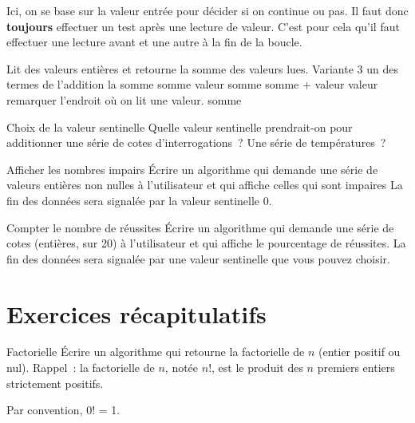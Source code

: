 		Ici, on se base sur la valeur entrée pour décider si on continue ou pas. 
		Il faut donc \textbf{toujours} effectuer un test
		après une lecture de valeur. C’est pour cela
		qu’il faut effectuer une lecture avant et une autre à
		la fin de la boucle.

		\begin{LDA}
		\LComment Lit des valeurs entières et retourne la somme des valeurs lues.
		 \RComment Variante 3
			 \RComment un des termes de l’addition
			 \RComment la somme
			\Let somme 
			\Read valeur
				\Let somme \Gets somme + valeur 
				\Read valeur \RComment remarquer l’endroit où on lit une valeur.
			\EndWhile
			\Return somme
		\EndAlgo
		\end{LDA}

		\begin{Exercice}{Choix de la valeur sentinelle}
			Quelle valeur sentinelle prendrait-on 
			pour additionner une série de cotes d’interrogations~? 
			Une série de températures~?
		\end{Exercice}

		\begin{Exercice}{Afficher les nombres impairs}
			Écrire un algorithme qui demande une série
			de valeurs entières non nulles à l'utilisateur
			et qui affiche celles qui sont impaires
			La fin des données sera signalée 
			par la valeur sentinelle 0.
		\end{Exercice}

		\begin{Exercice}{Compter le nombre de réussites}
			Écrire un algorithme qui demande une série
			de cotes (entières, sur 20) à l'utilisateur
			et qui affiche le pourcentage de réussites.
			La fin des données sera signalée 
			par une valeur sentinelle que vous pouvez choisir.
		\end{Exercice}
			
\section{Exercices récapitulatifs}

	\begin{Exercice}{Factorielle}
		Écrire un algorithme qui retourne la factorielle de $n$ (entier positif ou
		nul). Rappel~: la factorielle de $n$, notée $n$!, est le produit des $n$
		premiers entiers strictement positifs. 
		
		Par convention, 0! = 1.
	\end{Exercice}
	
